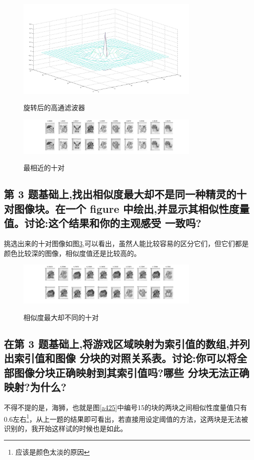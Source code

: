 \documentclass{ctexart}
\begin{document}
\begin{figure}
    \centering
    \includegraphics[width=0.8\textwidth]{process/a423b.jpg}\\
    \caption{旋转后的高通滤波器\label{a423b}}
\end{figure}
\begin{figure}
    \centering
    \includegraphics[width=0.8\textwidth]{process/a423c.jpg}\\
    \caption{最相近的十对\label{a423c}}
\end{figure}

\subsection{
第 3 题基础上,找出相似度最大却不是同一种精灵的十对图像块。在一个 figure 中绘出,并显示其相似性度量值。讨论:这个结果和你的主观感受
一致吗?}
挑选出来的十对图像如图\ref{a424a},可以看出，虽然人能比较容易的区分它们，但它们都是颜色比较深的图像，相似度值还是比较高的。
\begin{figure}
    \centering
    \includegraphics[width=0.8\textwidth]{process/a424a.jpg}\\
    \caption{相似度最大却不同的十对\label{a424a}}
\end{figure}
\subsection{
 在第 3 题基础上,将游戏区域映射为索引值的数组,并列出索引值和图像
分块的对照关系表。讨论:你可以将全部图像分块正确映射到其索引值吗?哪些
分块无法正确映射?为什么?
}
不得不提的是，海狮，也就是图\ref{a425}中编号15的块的两块之间相似性度量值只有0.6左右\footnote{应该是颜色太淡的原因}，从上一题的结果即可看出，若直接用设定阈值的方法，这两块是无法被识别的，我开始这样试的时候也是如此。
\end{document}
